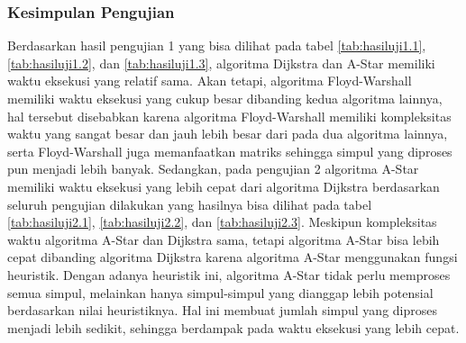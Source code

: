 \subsubsection{Kesimpulan Pengujian}
Berdasarkan hasil pengujian 1 yang bisa dilihat pada tabel \ref{tab:hasiluji1.1}, \ref{tab:hasiluji1.2}, dan \ref{tab:hasiluji1.3}, algoritma Dijkstra dan A-Star memiliki waktu eksekusi yang relatif sama. Akan tetapi, algoritma Floyd-Warshall memiliki waktu eksekusi yang cukup besar dibanding kedua algoritma lainnya, hal tersebut disebabkan karena algoritma Floyd-Warshall memiliki kompleksitas waktu yang sangat besar dan jauh lebih besar dari pada dua algoritma lainnya, serta Floyd-Warshall juga memanfaatkan matriks sehingga simpul yang diproses pun menjadi lebih banyak. Sedangkan, pada pengujian 2 algoritma A-Star memiliki waktu eksekusi yang lebih cepat dari algoritma Dijkstra berdasarkan seluruh pengujian dilakukan yang hasilnya bisa dilihat pada tabel \ref{tab:hasiluji2.1}, \ref{tab:hasiluji2.2}, dan \ref{tab:hasiluji2.3}. Meskipun kompleksitas waktu algoritma A-Star dan Dijkstra sama, tetapi algoritma A-Star bisa lebih cepat dibanding algoritma Dijkstra karena algoritma A-Star menggunakan fungsi heuristik. Dengan adanya heuristik ini, algoritma A-Star tidak perlu memproses semua simpul, melainkan hanya simpul-simpul yang dianggap lebih potensial berdasarkan nilai heuristiknya. Hal ini membuat jumlah simpul yang diproses menjadi lebih sedikit, sehingga berdampak pada waktu eksekusi yang lebih cepat.